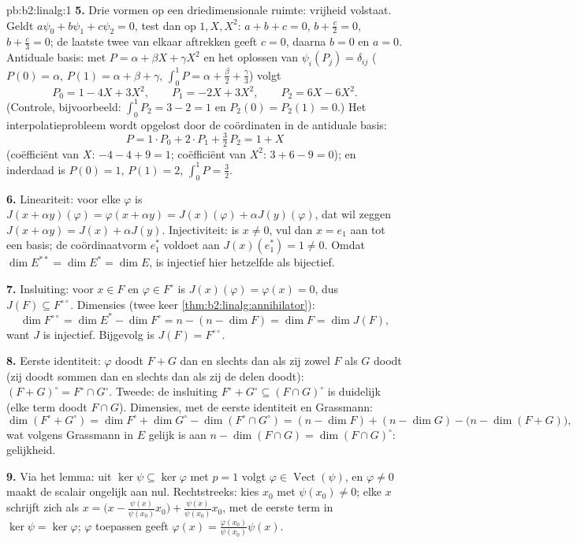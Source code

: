 \begin{solution}{pb:b2:linalg:1}
\textbf{5.} Drie vormen op een driedimensionale ruimte: vrijheid
volstaat. Geldt $a\psi_0 + b\psi_1 + c\psi_2 = 0$, test dan op $1,
X, X^2$: $a + b + c = 0$, $b + \frac c2 = 0$, $b + \frac c3 = 0$;
de laatste twee van elkaar aftrekken geeft $c = 0$, daarna $b = 0$
en $a = 0$. Antiduale basis: met $P = \alpha + \beta X + \gamma
X^2$ en het oplossen van $\psi_i(P_j) = \delta_{ij}$ ($P(0) =
\alpha$, $P(1) = \alpha + \beta + \gamma$, $\int_0^1 P = \alpha +
\frac\beta2 + \frac\gamma3$) volgt
\[
P_0 = 1 - 4X + 3X^2, \qquad
P_1 = -2X + 3X^2, \qquad
P_2 = 6X - 6X^2 .
\]
(Controle, bijvoorbeeld: $\int_0^1 P_2 = 3 - 2 = 1$ en $P_2(0) =
P_2(1) = 0$.) Het interpolatieprobleem wordt opgelost door de
coördinaten in de antiduale basis:
\[
P = 1\cdot P_0 + 2\cdot P_1 + \tfrac32\, P_2 = 1 + X
\]
(coëfficiënt van $X$: $-4 - 4 + 9 = 1$; coëfficiënt van $X^2$: $3
+ 6 - 9 = 0$); en inderdaad is $P(0) = 1$, $P(1) = 2$, $\int_0^1 P
= \frac32$.

\textbf{6.} Lineariteit: voor elke $\varphi$ is $J(x + \alpha
y)(\varphi) = \varphi(x + \alpha y) = J(x)(\varphi) + \alpha
J(y)(\varphi)$, dat wil zeggen $J(x + \alpha y) = J(x) + \alpha
J(y)$. Injectiviteit: is $x \neq 0$, vul dan $x = e_1$ aan tot een
basis; de coördinaatvorm $e_1^*$ voldoet aan $J(x)(e_1^*) = 1 \neq
0$. Omdat $\dim E^{**} = \dim E^* = \dim E$, is injectief hier
hetzelfde als bijectief.

\textbf{7.} Insluiting: voor $x \in F$ en $\varphi \in F^\circ$ is
$J(x)(\varphi) = \varphi(x) = 0$, dus $J(F) \subseteq
F^{\circ\circ}$. Dimensies (twee keer
\cref{thm:b2:linalg:annihilator}):
\[
\dim F^{\circ\circ} = \dim E^* - \dim F^\circ
= n - (n - \dim F) = \dim F = \dim J(F),
\]
want $J$ is injectief. Bijgevolg is $J(F) = F^{\circ\circ}$.

\textbf{8.} Eerste identiteit: $\varphi$ doodt $F + G$ dan en
slechts dan als zij zowel $F$ als $G$ doodt (zij doodt sommen dan
en slechts dan als zij de delen doodt): $(F+G)^\circ = F^\circ
\cap G^\circ$. Tweede: de insluiting $F^\circ + G^\circ \subseteq
(F \cap G)^\circ$ is duidelijk (elke term doodt $F \cap G$).
Dimensies, met de eerste identiteit en Grassmann:
\[
\dim(F^\circ + G^\circ) = \dim F^\circ + \dim G^\circ -
\dim(F^\circ \cap G^\circ)
= (n - \dim F) + (n - \dim G) - \bigl(n - \dim(F +
G)\bigr),
\]
wat volgens Grassmann in $E$ gelijk is aan $n - \dim(F \cap G) =
\dim(F \cap G)^\circ$: gelijkheid.

\textbf{9.} Via het lemma: uit $\ker\psi \subseteq \ker\varphi$
met $p = 1$ volgt $\varphi \in \operatorname{Vect}(\psi)$, en
$\varphi \neq 0$ maakt de scalair ongelijk aan nul. Rechtstreeks:
kies $x_0$ met $\psi(x_0) \neq 0$; elke $x$ schrijft zich als $x =
\bigl(x - \frac{\psi(x)}{\psi(x_0)}x_0\bigr) +
\frac{\psi(x)}{\psi(x_0)} x_0$, met de eerste term in $\ker\psi =
\ker\varphi$; $\varphi$ toepassen geeft $\varphi(x) =
\frac{\varphi(x_0)}{\psi(x_0)}\psi(x)$.


\end{solution}
